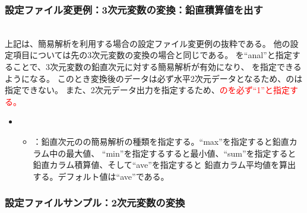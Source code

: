 \subsubsection{設定ファイル変更例：3次元変数の変換：鉛直積算値を出す}

\\

上記は、簡易解析を利用する場合の設定ファイル変更例の抜粋である。
他の設定項目については先の3次元変数の変換の場合と同じである。
を``anal''と指定することで、3次元変数の鉛直次元に対する簡易解析が有効になり、
を指定できるようになる。
このとき変換後のデータは必ず水平2次元データとなるため、のは
指定できない。
また、2次元データ出力を指定するため、\textcolor{red}{のを必ず``1''と指定する。}

\begin{itemize}
 \item {}
 \begin{itemize}
  \item {}：鉛直次元のの簡易解析の種類を指定する。``max''を指定すると鉛直カラム中の最大値、
        ``min''を指定するすると最小値、``sum''を指定すると鉛直カラム積算値、そして``ave''を指定すると
        鉛直カラム平均値を算出する。デフォルト値は``ave''である。
 \end{itemize}
\end{itemize}

\subsubsection{設定ファイルサンプル：2次元変数の変換}

